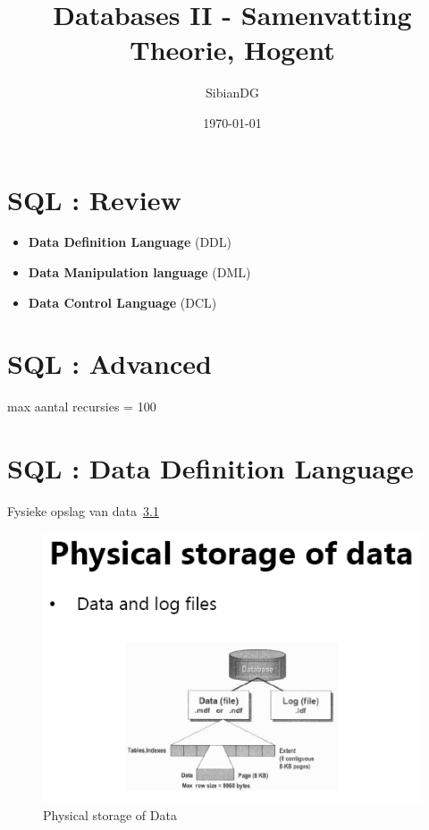 \documentclass{report}
\title{Databases II - Samenvatting Theorie, Hogent}
\author{SibianDG}
\date{\today}
\begin{document}
    \maketitle
    \tableofcontents
    \newpage
    
{\let\clearpage\relax \chapter{SQL : Review}}
    
    \begin{theo}
         \textrightarrow
        \begin{itemize}
            \item \textbf{Data Definition Language} (DDL) 
            \item \textbf{Data Manipulation language} (DML)
            \item \textbf{Data Control Language} (DCL)
        \end{itemize}
    \end{theo}    

{\let\clearpage\relax \chapter{SQL : Advanced}}
    
    max aantal recursies = 100

{\let\clearpage\relax \chapter{SQL : Data Definition Language}}
    
    Fysieke opslag van data~\ref{fig:physicalStorageOfData}
    \begin{figure}
        \includegraphics[width=350pt]{./images/storageData.png}
        \caption{\label{fig:physicalStorageOfData}Physical storage of Data}
    \end{figure}
\end{document}
